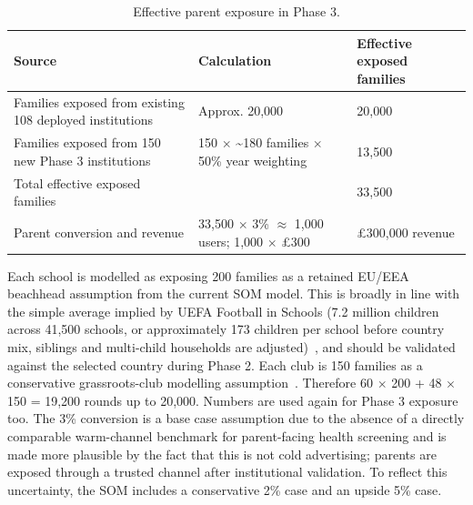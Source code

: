 \begin{table}[htbp]
    \centering
    \footnotesize
    \caption{Effective parent exposure in Phase 3.}
    \label{tab:ent-som-family-exposure}
    \begin{tabular}{p{6.6cm}p{5.2cm}p{2.8cm}}
        \toprule
        \textbf{Source} & \textbf{Calculation} & \textbf{Effective exposed families} \\
        \midrule
        Families exposed from existing 108 deployed institutions & Approx. 20,000 & 20,000 \\
        Families exposed from 150 new Phase 3 institutions & 150 $\times$ \textasciitilde{}180 families $\times$ 50\% year weighting & 13,500 \\
        \midrule
        Total effective exposed families & & 33,500 \\
        Parent conversion and revenue & 33,500 $\times$ 3\% $\approx$ 1,000 users; 1,000 $\times$ \pounds{}300 & \pounds{}300,000 revenue \\
        \bottomrule
    \end{tabular}
\end{table}

Each school is modelled as exposing 200 families as a retained EU/EEA beachhead assumption from the current SOM model. This is broadly in line with the simple average implied by UEFA Football in Schools (7.2 million children across 41,500 schools, or approximately 173 children per school before country mix, siblings and multi-child households are adjusted)~\cite{uefa2025schools}, and should be validated against the selected country during Phase 2. Each club is 150 families as a conservative grassroots-club modelling assumption~\cite{ukparliament2023clubs}. Therefore 60 $\times$ 200 + 48 $\times$ 150 = 19,200 rounds up to 20,000. Numbers are used again for Phase 3 exposure too. The 3\% conversion is a base case assumption due to the absence of a directly comparable warm-channel benchmark for parent-facing health screening and is made more plausible by the fact that this is not cold advertising; parents are exposed through a trusted channel after institutional validation. To reflect this uncertainty, the SOM includes a conservative 2\% case and an upside 5\% case.


